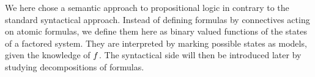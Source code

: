 

We here chose a semantic approach to propositional logic in contrary to the standard syntactical approach.
Instead of defining formulas by connectives acting on atomic formulas, we define them here as binary valued functions of the states of a factored system.
They are interpreted by marking possible states as models, given the knowledge of $f$.
The syntactical side will then be introduced later by studying decompositions of formulas.


%	



